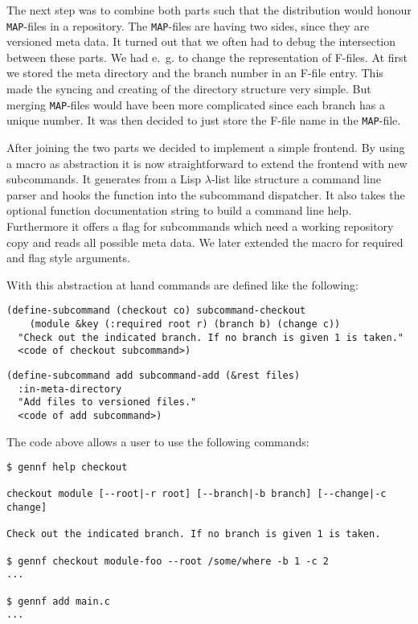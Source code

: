 \documentclass[fleqn, 10pt, a4paper]{report} \usepackage{amssymb}
\begin{document}
The next step was to combine both parts such that the distribution would
honour \texttt{MAP}-files in a repository. The \texttt{MAP}-files are
having two sides, since they are versioned meta data. It turned out
that we often had to debug the intersection between these parts. We
had e.~g. to change the representation of F-files. At first we stored
the meta directory and the branch number in an F-file entry. This made
the syncing and creating of the directory structure very simple. But
merging \texttt{MAP}-files would have been more complicated since
each branch has a unique number. It was then decided to just store the
F-file name in the \texttt{MAP}-file.

After joining the two parts we decided to implement a simple frontend.
By using a macro as abstraction it is now straightforward to extend
the frontend with new subcommands. It generates from a Lisp
$\lambda$-list like structure a command line parser and hooks the
function into the subcommand dispatcher. It also takes the optional
function documentation string to build a command line help.
Furthermore it offers a flag for subcommands which need a working
repository copy and reads all possible meta data. We later extended
the macro for required and flag style arguments.

With this abstraction at hand commands are defined like the following:

{\small
\begin{verbatim}
(define-subcommand (checkout co) subcommand-checkout
    (module &key (:required root r) (branch b) (change c))
  "Check out the indicated branch. If no branch is given 1 is taken."
  <code of checkout subcommand>)
\end{verbatim}

\newpage

\begin{verbatim}
(define-subcommand add subcommand-add (&rest files)
  :in-meta-directory
  "Add files to versioned files."
  <code of add subcommand>)
\end{verbatim}}

The code above allows a user to use the following commands:

{\small
\begin{verbatim}
$ gennf help checkout

checkout module [--root|-r root] [--branch|-b branch] [--change|-c change]

Check out the indicated branch. If no branch is given 1 is taken.

$ gennf checkout module-foo --root /some/where -b 1 -c 2 
...

$ gennf add main.c
...
\end{verbatim}
}
\end{document}
